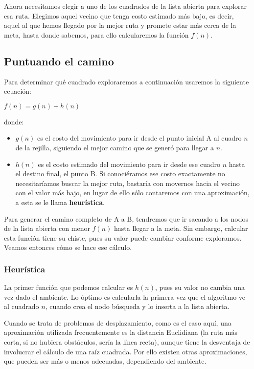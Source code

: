 Ahora necesitamos elegir a uno de los cuadrados de la lista abierta para explorar esa ruta. Elegimos aquel vecino que tenga costo estimado más bajo, es decir, aquel al que hemos llegado por la mejor ruta y promete estar más cerca de la meta, hasta donde sabemos, para ello calcularemos la función $f(n)$.

\subsection{Puntuando el camino}

Para determinar qué cuadrado exploraremos a continuación usaremos la siguiente ecuación:

\begin{center}
\(f(n) = g(n) + h(n)\)
\end{center}

donde:

\begin{itemize}
  \item \(g(n)\) es el costo del movimiento para ir desde el punto inicial A al cuadro \(n\) de la rejilla, siguiendo el mejor camino que se generó para llegar a $n$.

  \item \(h(n)\) es el costo estimado del movimiento para ir desde ese cuadro \(n\) hasta el destino final, el punto B. Si conociéramos ese costo exactamente no necesitaríamos buscar la mejor ruta, bastaría con movernos hacia el vecino con el valor más bajo, en lugar de ello sólo contaremos con una aproximación, a esta se le llama \textbf{heurística}.
\end{itemize}

Para generar el camino completo de A a B, tendremos que ir sacando a los nodos de la lista abierta con menor \(f(n)\) hasta llegar a la meta.  Sin embargo, calcular esta función tiene su chiste, pues su valor puede cambiar conforme exploramos.  Veamos entonces cómo se hace ese cálculo.


\subsubsection{Heurística}

La primer función que podemos calcular es \(h(n)\), pues su valor no cambia una vez dado el ambiente.  Lo óptimo es calcularla la primera vez que el algoritmo ve al cuadrado \(n\), cuando crea el nodo búsqueda y lo inserta a la lista abierta.

Cuando se trata de problemas de desplazamiento, como es el caso aquí, una aproximación utilizada frecuentemente es la distancia Euclidiana (la ruta más corta, si no hubiera obstáculos, sería la línea recta), aunque tiene la desventaja de involucrar el cálculo de una raíz cuadrada. Por ello existen otras aproximaciones, que pueden ser más o menos adecuadas, dependiendo del ambiente.

